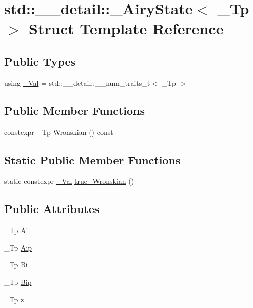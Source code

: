 \hypertarget{structstd_1_1____detail_1_1__AiryState}{}\section{std\+:\+:\+\_\+\+\_\+detail\+:\+:\+\_\+\+Airy\+State$<$ \+\_\+\+Tp $>$ Struct Template Reference}
\label{structstd_1_1____detail_1_1__AiryState}
\subsection*{Public Types}
\begin{DoxyCompactItemize}
\item 
using \hyperlink{structstd_1_1____detail_1_1__AiryState_ade9eab191e3cc77ebd4e3522aa1fe959}{\+\_\+\+Val} = std\+::\+\_\+\+\_\+detail\+::\+\_\+\+\_\+num\+\_\+traits\+\_\+t$<$ \+\_\+\+Tp $>$
\end{DoxyCompactItemize}
\subsection*{Public Member Functions}
\begin{DoxyCompactItemize}
\item 
constexpr \+\_\+\+Tp \hyperlink{structstd_1_1____detail_1_1__AiryState_a6e857da9719115fe190eadd04d05de41}{Wronskian} () const 
\end{DoxyCompactItemize}
\subsection*{Static Public Member Functions}
\begin{DoxyCompactItemize}
\item 
static constexpr \hyperlink{structstd_1_1____detail_1_1__AiryState_ade9eab191e3cc77ebd4e3522aa1fe959}{\+\_\+\+Val} \hyperlink{structstd_1_1____detail_1_1__AiryState_a7eb0cbdf39102c8bb2165a67fdf493f5}{true\+\_\+\+Wronskian} ()
\end{DoxyCompactItemize}
\subsection*{Public Attributes}
\begin{DoxyCompactItemize}
\item 
\+\_\+\+Tp \hyperlink{structstd_1_1____detail_1_1__AiryState_a9d5374d09f020d9cf0c46f1e4d2568dc}{Ai}
\item 
\+\_\+\+Tp \hyperlink{structstd_1_1____detail_1_1__AiryState_aeecc49a563e8261c6d1f77b285df42ee}{Aip}
\item 
\+\_\+\+Tp \hyperlink{structstd_1_1____detail_1_1__AiryState_a1df8de2b3b56ac379825c540452260a4}{Bi}
\item 
\+\_\+\+Tp \hyperlink{structstd_1_1____detail_1_1__AiryState_a150eaeb1b7b0ab87dd68381d1156d433}{Bip}
\item 
\+\_\+\+Tp \hyperlink{structstd_1_1____detail_1_1__AiryState_ac19aba6567e1c3735ed68d46bb13a1d4}{z}
\end{DoxyCompactItemize}


